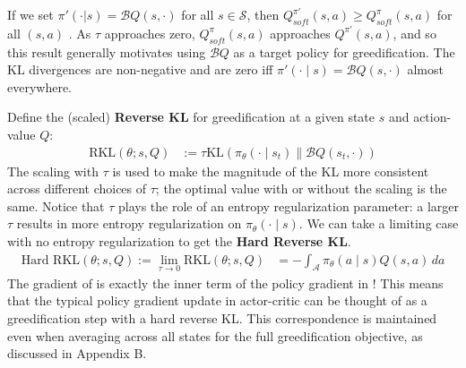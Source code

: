 \documentclass{article}
\newcommand{\statespace}{\mathcal{S}}
\newcommand{\actionspace}{\mathcal{A}}
\newcommand{\Qhat}{{Q}}
\newcommand{\KL}{\mathrm{KL}}
\newcommand{\policyparams}{\theta}
\newcommand{\boltzmannQ}{\mathcal{B}Q}
\newcommand{\entropy}{\mathcal{H}}
\newcommand{\defeq}{:=}
\begin{document}
If we set $\pi'(\cdot | s) = \boltzmannQ(s, \cdot)$ for all $s \in \statespace$, then $Q^{\pi'}_{soft}(s,a) \ge Q^{\pi}_{soft}(s,a)$ for all $(s,a)$ \citep[Theorem 4]{haarnoja2017reinforcement}. As $\tau$ approaches zero, $Q^{\pi}_{soft}(s,a)$ approaches $Q^{\pi'}(s,a)$, and so this result generally motivates using $\boltzmannQ$ as a target policy for greedification. The KL divergences are non-negative and are zero iff $\pi'(\cdot \mid s) = \boltzmannQ(s, \cdot)$ almost everywhere.  

Define the (scaled) \textbf{Reverse KL} for greedification at a given state $s$ and action-value $\Qhat$:%
%
\begin{align*}
 \text{RKL}(\policyparams; s, \Qhat) &\defeq \tau\KL\left( \pi_\policyparams(\cdot \mid s_t) \parallel \boltzmannQ(s_t, \cdot) \right)%
\end{align*}
%
The scaling with $\tau$ is used to make the magnitude of the KL more consistent across different choices of $\tau$; the optimal value with or without the scaling is the same. 
Notice that $\tau$ plays the role of an entropy regularization parameter: a larger $\tau$ results in more entropy regularization on $\pi_\policyparams(\cdot \mid s)$.
We can take a limiting case with no entropy regularization to get the \textbf{Hard Reverse KL}.
%
\begin{align}\label{eq:hard-reverse-KL}
    \text{Hard RKL}(\policyparams; s, \Qhat) \defeq \lim_{\tau \to 0} \text{RKL}(\policyparams; s, \Qhat) &= -\int_\actionspace \pi_\theta(a \mid s) Q(s, a)\, da
\end{align}
The gradient of  is exactly the inner term of the policy gradient in ! 
This means that the typical policy gradient update in actor-critic can be thought of as a greedification step with a hard reverse KL. This correspondence is maintained even when averaging across all states for the full greedification objective, as discussed in Appendix B.
\end{document}
